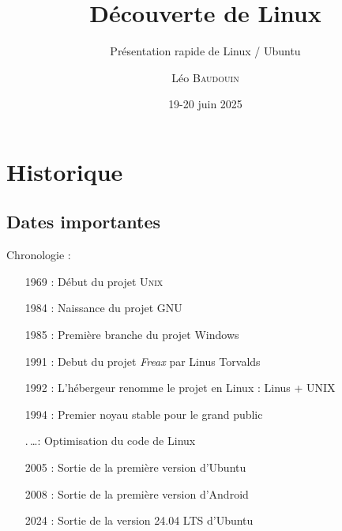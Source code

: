 \documentclass{beamer}
\title[Pr\'esentation Linux]{D\'ecouverte de Linux}
\subtitle{Présentation rapide de Linux / Ubuntu}
\author{L\'eo \textsc{Baudouin}}
\institute{
  {\url{baudouin.leo @ gmail.com}}
}
\date{19-20 juin 2025}
\begin{document}
\begin{frame}
\titlepage
\end{frame}

\begin{frame}
\tableofcontents
\end{frame}


\section{Historique}
\subsection{Dates importantes}
\begin{frame}
  \begin{block}{Chronologie :}
   ~~~~\begin{minipage}{\linewidth}
      \begin{itemize}
      \item[1969 :] Début du projet U\textsc{nix}
      \item[1984 :] Naissance du projet GNU
      \item[1985 :] Première branche du projet Windows
      \item[1991 :] Debut du projet \textit{Freax} par Linus Torvalds
      \item[1992 :] L'h\'ebergeur renomme le projet en Linux : Linus + UNIX
      \item[1994 :] Premier noyau stable pour le grand public
      \item[.\,\dots :] Optimisation du code de Linux
      \item[2005 :] Sortie de la première version d'Ubuntu
      \item[2008 :] Sortie de la première version d'Android
      \item[2024 :] Sortie de la version 24.04 LTS d'Ubuntu
      \end{itemize}
    \end{minipage}
  \end{block}
\end{frame}
\end{document}
